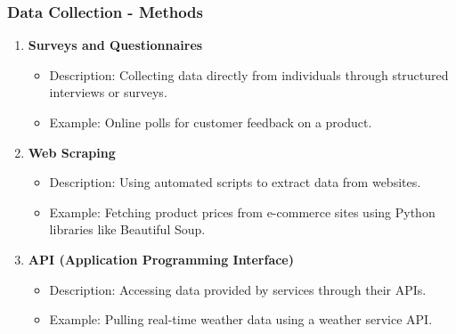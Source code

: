 \documentclass[aspectratio=169]{beamer}
\begin{document}
\begin{frame}[fragile]
    \frametitle{Data Collection - Methods}
    \begin{enumerate}
        \item \textbf{Surveys and Questionnaires}
            \begin{itemize}
                \item Description: Collecting data directly from individuals through structured interviews or surveys.
                \item Example: Online polls for customer feedback on a product.
            \end{itemize}
        
        \item \textbf{Web Scraping}
            \begin{itemize}
                \item Description: Using automated scripts to extract data from websites.
                \item Example: Fetching product prices from e-commerce sites using Python libraries like Beautiful Soup.
            \end{itemize}

        \item \textbf{API (Application Programming Interface)}
            \begin{itemize}
                \item Description: Accessing data provided by services through their APIs.
                \item Example: Pulling real-time weather data using a weather service API.
            \end{itemize}
    \end{enumerate}
\end{frame}
\end{document}
